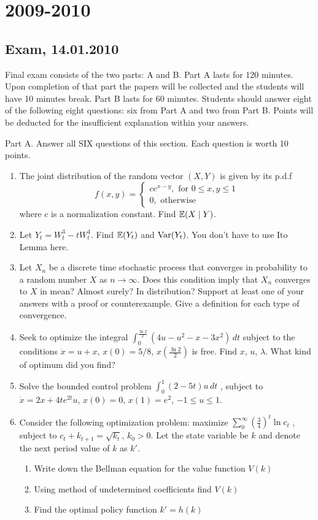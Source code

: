 \documentclass[pdftex,12pt,a4paper]{article}
\begin{document}
\section{2009-2010}

\subsection{Exam, 14.01.2010}

Final exam consists of the two parts: A and B. Part A lasts for 120 minutes.
Upon completion of that part the papers will be collected and the students will have 10 minutes break. 
Part B lasts for 60 minutes.
Students should answer eight of the following eight questions: six from Part A and two from Part B. 
Points will be deducted for the insufficient explanation within your answers.

Part A.
Answer all SIX questions of this section. Each question is worth 10 points.

\begin{enumerate}
\item  The joint distribution of the random vector $(X,Y)$ is given by its p.d.f 
\[
f(x,y)=
\left\{
  \begin{array}{l}
    c e^{x-y}, \text{ for } 0\leq x,y\leq 1 \\
    0, \text{ otherwise}    
  \end{array}
\right.
\]
where $c$ is a normalization constant. Find $\mathbb{E}(X\mid Y)$.

\item Let $Y_t=W_t^3-tW_t^4$. Find $\mathbb{E}(Y_t)$ and $\operatorname{Var}(Y_t)$.  You don’t have to use Ito Lemma here.
\item Let $X_n$ be a discrete time stochastic process that converges in probability to a random number $X$ as $n\to \infty$. Does this condition imply that $X_n$ converges to $X$ in mean? Almost surely? In distribution? Support at least one of your answers with a proof or counterexample. Give a definition for each type of convergence. 
\item Seek to optimize the integral 
$\int_0^{\frac{\ln 2}{2}} (4u-u^2-x-3x^2)\,dt$
subject to the conditions $\dot{x}=u+x$, $x(0)=5/8$, $x\left(\frac{\ln 2}{2}\right)$ is free. Find $x$, $u$, $\lambda$. What kind of optimum did you find?
\item Solve the bounded control problem 
$\int_0^1 (2-5t)u\,dt$
, subject to $\dot{x}=2x+4te^{2t}u$, $x(0)=0$, $x(1)=e^2$, $-1\leq u\leq 1$.
\item Consider the following optimization problem: maximize 
$\sum_0^{\infty} \left(\frac{3}{4}\right)^t \ln c_t$
, subject to $c_t+k_{t+1}=\sqrt{k_t}$, $k_0>0$. Let the state variable be $k$ and denote the next period value of $k$ as $k'$.
\begin{enumerate}
\item Write down the Bellman equation for the value function $V(k)$
\item Using method of undetermined coefficients find $V(k)$
\item Find the optimal policy function $k'=h(k)$ 
\end{enumerate} 

\end{enumerate}
\end{document}
